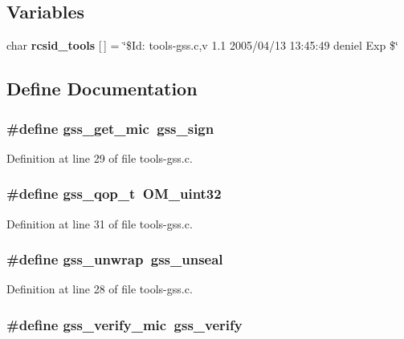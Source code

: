 \subsection*{Variables}
\begin{CompactItemize}
\item 
char {\bf rcsid\_\-tools} [$\,$] = \char`\"{}\$Id: tools-gss.c,v 1.1 2005/04/13 13:45:49 deniel Exp \$\char`\"{}
\end{CompactItemize}


\subsection{Define Documentation}
\subsubsection{\setlength{\rightskip}{0pt plus 5cm}\#define gss\_\-get\_\-mic\ gss\_\-sign}\label{tools-gss_8c_a2}




Definition at line 29 of file tools-gss.c.
\subsubsection{\setlength{\rightskip}{0pt plus 5cm}\#define gss\_\-qop\_\-t\ OM\_\-uint32}\label{tools-gss_8c_a4}




Definition at line 31 of file tools-gss.c.
\subsubsection{\setlength{\rightskip}{0pt plus 5cm}\#define gss\_\-unwrap\ gss\_\-unseal}\label{tools-gss_8c_a1}




Definition at line 28 of file tools-gss.c.
\subsubsection{\setlength{\rightskip}{0pt plus 5cm}\#define gss\_\-verify\_\-mic\ gss\_\-verify}\label{tools-gss_8c_a3}




